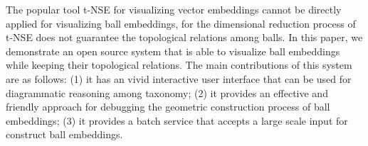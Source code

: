 \documentclass[]{article}
\begin{document}


The popular  tool t-NSE \cite{Maaten08} for visualizing vector embeddings cannot be directly applied for visualizing ball embeddings, for the dimensional reduction process of t-NSE does not guarantee the topological relations among balls. In this paper, we demonstrate an open source system that is able to visualize ball embeddings while keeping their topological relations. The main contributions of this system are as follows: (1) it has an vivid interactive user interface that can be used for diagrammatic reasoning among taxonomy; (2) it provides an effective and friendly approach for debugging the geometric construction process of ball embeddings; (3) it provides a batch service that accepts a large scale input for construct ball embeddings. 
\end{document}
